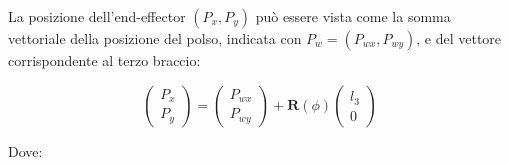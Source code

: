 \documentclass[11pt, a4paper]{article}
\begin{document}
\begin{par}
\begin{flushleft}
La posizione dell'end-effector $(P_x ,P_y )$ può essere vista come la somma vettoriale della posizione del polso, indicata con $P_w =(P_{wx} ,P_{wy} )$, e del vettore corrispondente al terzo braccio:
\end{flushleft}
\end{par}
\[
    \begin{pmatrix}
        P_x \\
        P_y
    \end{pmatrix}
    =
    \begin{pmatrix}
        P_{wx} \\
        P_{wy}
    \end{pmatrix}
    + \mathbf{R}(\phi )
    \begin{pmatrix}
        l_{3}\\
        0
    \end{pmatrix}
\]
\begin{par}
\begin{flushleft}
Dove:
\end{flushleft}
\end{par}
\end{document}
